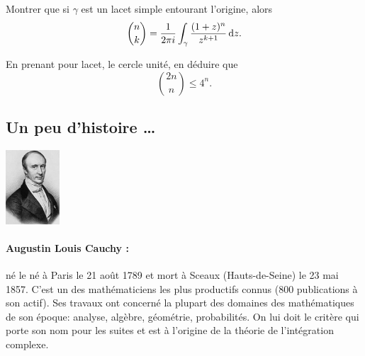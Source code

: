 \begin{exer}
\begin{MYenumerate}
\item Montrer que si $\gamma$ est un lacet simple entourant l'origine, alors 
\[\binom{n}{k} = \frac{1}{2 \pi i} \int_\gamma \frac{(1+z)^n}{z^{k+1}} \mathop{}\mathopen{}\mathrm{d} z.\]
\item En prenant pour lacet, le cercle unité, en déduire que 
\[\binom{2 n}{n} \leq 4^n.\]
\end{MYenumerate}
\end{exer}

\newpage 
\subsection*{Un peu d'histoire \dots}

\begin{minipage}{0.2\linewidth}
\begin{center}\includegraphics[width=2cm]{images/Cauchy.jpg}\end{center}
\end{minipage}
\begin{minipage}{0.80 \linewidth}
\small{\paragraph*{Augustin Louis Cauchy :} né le  né à Paris le 21 août 1789 et mort à Sceaux (Hauts-de-Seine) le 23 mai 1857. C'est un des mathématiciens les plus productifs connus (800 publications à son actif). Ses travaux ont concerné la plupart des domaines des mathématiques de son époque: analyse, algèbre, géométrie, probabilités. On lui doit le critère qui porte son nom pour les suites et est à l'origine de la théorie de l'intégration complexe.}
\end{minipage}

\vfill


